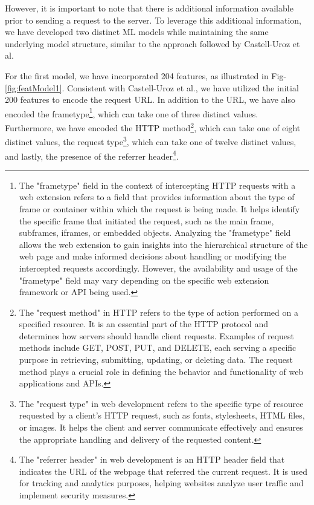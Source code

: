 However, it is important to note that there is additional information available prior to sending a request to the server.
To leverage this additional information, we have developed two distinct ML models while maintaining
the same underlying model structure, similar to the approach followed by Castell-Uroz et al.

For the first model, we have incorporated 204 features, as illustrated in Fig-\ref{fig:featModel1}. Consistent with Castell-Uroz et al.,
we have utilized the initial 200 features to encode the request URL. In addition to the URL, we have also encoded the frametype\footnote{The "frametype" field in the context of intercepting HTTP requests with a web extension refers to a field that provides information about the type of frame or container within which the request is being made. It helps identify the specific frame that initiated the request, such as the main frame, subframes, iframes, or embedded objects. Analyzing the "frametype" field allows the web extension to gain insights into the hierarchical structure of the web page and make informed decisions about handling or modifying the intercepted requests accordingly. However, the availability and usage of the "frametype" field may vary depending on the specific web extension framework or API being used.},
which can take one of three distinct values. Furthermore, we have encoded the HTTP method\footnote{The "request method" in HTTP refers to the type of action performed on a specified resource. It is an essential part of the HTTP protocol and determines how servers should handle client requests. Examples of request methods include GET, POST, PUT, and DELETE, each serving a specific purpose in retrieving, submitting, updating, or deleting data. The request method plays a crucial role in defining the behavior and functionality of web applications and APIs.}, which can take
one of eight distinct values, the request type\footnote{The "request type" in web development refers to the specific type of resource requested by a client's HTTP request, such as fonts, stylesheets, HTML files, or images. It helps the client and server communicate effectively and ensures the appropriate handling and delivery of the requested content.}, which can take one of twelve distinct values,
and lastly, the presence of the referrer header\footnote{The "referrer header" in web development is an HTTP header field that indicates the URL of the webpage that referred the current request. It is used for tracking and analytics purposes, helping websites analyze user traffic and implement security measures.}.

